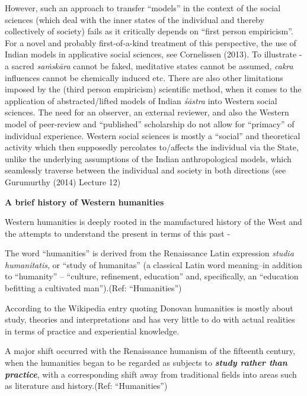 However, such an approach to transfer ``models'' in the context of the social sciences (which deal with the inner states of the individual and thereby collectively of society) fails as it critically depends on ``first person empiricism''. For a novel and probably first-of-a-kind treatment of this perspective, the use of Indian models in applicative social sciences, see Cornelissen (2013). To illustrate - a sacred {\sl saṁskāra} cannot be faked, meditative states cannot be assumed, {\sl cakra} influences cannot be chemically induced etc. There are also other limitations imposed by the (third person empiricism) scientific method, when it comes to the application of abstracted/lifted models of Indian {\sl śāstra} into Western social sciences. The need for an observer, an external reviewer, and also the Western model of peer-review and ``published'' scholarship do not allow for ``primacy'' of individual experience. Western social sciences is mostly a ``social'' and theoretical activity which then supposedly percolates to/affects the individual via the State, unlike the underlying assumptions of the Indian anthropological models, which seamlessly traverse between the individual and society in both directions (see Gurumurthy (2014) Lecture 12)

{\bf A brief history of Western humanities}

Western humanities is deeply rooted in the manufactured history of the West and the attempts to understand the present in terms of this past -
\begin{myquote}
The word ``humanities'' is derived from the Renaissance Latin expression {\sl studia humanitatis}, or ``study of humanitas'' (a classical Latin word meaning--in addition to ``humanity'' -- ``culture, refinement, education'' and, specifically, an ``education befitting a cultivated man'').\hfill (Ref: ``Humanities'')
\end{myquote}

According to the Wikipedia entry quoting Donovan humanities is mostly about study, theories and interpretations and has very little to do with actual realities in terms of practice and experiential knowledge.
\begin{myquote}
A major shift occurred with the Renaissance humanism of the fifteenth century, when the humanities began to be regarded as subjects to {{\sl\bfseries study rather than practice}\relax}, with a corresponding shift away from traditional fields into areas such as literature and history.\hfill (Ref: ``Humanities'')
\end{myquote}

